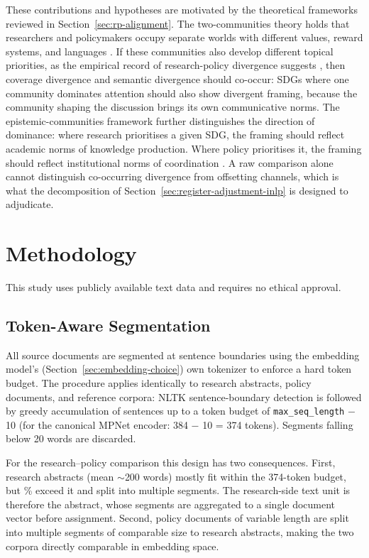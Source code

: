 \documentclass[12pt,a4paper]{article}
\let\OldSection\section
\renewcommand{\section}{\clearpage\FloatBarrier\OldSection}
\begin{document}
These contributions and hypotheses are motivated by the theoretical frameworks reviewed in Section~\ref{sec:rp-alignment}. The two-communities theory holds that researchers and policymakers occupy separate worlds with different values, reward systems, and languages \parencite{Caplan1979}. If these communities also develop different topical priorities, as the empirical record of research-policy divergence suggests \parencite{Strauss2025, McCarthy2026}, then coverage divergence and semantic divergence should co-occur: SDGs where one community dominates attention should also show divergent framing, because the community shaping the discussion brings its own communicative norms. The epistemic-communities framework further distinguishes the direction of dominance: where research prioritises a given SDG, the framing should reflect academic norms of knowledge production. Where policy prioritises it, the framing should reflect institutional norms of coordination \parencite{Haas1992}. A raw comparison alone cannot distinguish co-occurring divergence from offsetting channels, which is what the decomposition of Section~\ref{sec:register-adjustment-inlp} is designed to adjudicate.
\section{Methodology}
\label{sec:method}

This study uses publicly available text data and requires no ethical approval.

\subsection{Token-Aware Segmentation}\label{sec:segmentation}

 All source documents are segmented at sentence boundaries using the embedding model's (Section~\ref{sec:embedding-choice}) own tokenizer to enforce a hard token budget. The procedure applies identically to research abstracts, policy documents, and reference corpora: NLTK sentence-boundary detection is followed by greedy accumulation of sentences up to a token budget of \texttt{max\_seq\_length} $-$ 10 (for the canonical MPNet encoder: 384 $-$ 10 = 374 tokens). Segments falling below 20 words are discarded.

 For the research--policy comparison this design has two consequences. First, research abstracts (mean $\sim$200 words) mostly fit within the 374-token budget, but \NResearchMultiSegPct{}\% exceed it and split into multiple segments. The research-side text unit is therefore the abstract, whose segments are aggregated to a single document vector before assignment. Second, policy documents of variable length are split into multiple segments of comparable size to research abstracts, making the two corpora directly comparable in embedding space.
\end{document}
